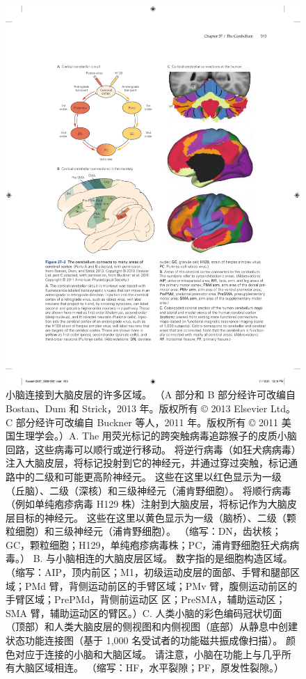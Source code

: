 \begin{figure}[htbp]
	\centering
	\includegraphics[width=0.9\linewidth]{chap37/fig_37_3}
	\caption{小脑连接到大脑皮层的许多区域。 （A 部分和 B 部分经许可改编自 Bostan、Dum 和 Strick，2013 年。版权所有 © 2013 Elsevier Ltd。C 部分经许可改编自 Buckner 等人，2011 年。版权所有 © 2011 美国生理学会。）A. The 用荧光标记的跨突触病毒追踪猴子的皮质小脑回路，这些病毒可以顺行或逆行移动。 将逆行病毒（如狂犬病病毒）注入大脑皮层，将标记投射到它的神经元，并通过穿过突触，标记通路中的二级和可能更高阶神经元。 这些在这里以红色显示为一级（丘脑）、二级（深核）和三级神经元（浦肯野细胞）。 将顺行病毒（例如单纯疱疹病毒 H129 株）注射到大脑皮层，将标记作为大脑皮层目标的神经元。 这些在这里以黄色显示为一级（脑桥）、二级（颗粒细胞）和三级神经元（浦肯野细胞）。 （缩写：DN，齿状核；GC，颗粒细胞；H129，单纯疱疹病毒株；PC，浦肯野细胞狂犬病病毒。） B. 与小脑相连的大脑皮层区域。 数字指的是细胞构造区域。 （缩写：AIP，顶内前区；M1，初级运动皮层的面部、手臂和腿部区域；PMd 臂，背侧运动前区的手臂区域；PMv 臂，腹侧运动前区的手臂区域；PrePMd，背侧前运动区 区；PreSMA，辅助运动区；SMA 臂，辅助运动区的臂区。）C. 人类小脑的彩色编码冠状切面（顶部）和人类大脑皮层的侧视图和内侧视图（底部）从静息中创建 状态功能连接图（基于 1,000 名受试者的功能磁共振成像扫描）。 颜色对应于连接的小脑和大脑区域。 请注意，小脑在功能上与几乎所有大脑区域相连。 （缩写：HF，水平裂隙；PF，原发性裂隙。）}
	\label{fig:37_3}
\end{figure}



